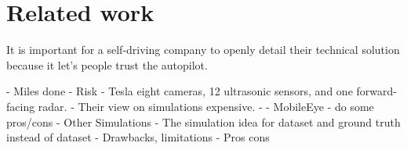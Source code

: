 \chapter{Related work}
\label{chap:relatedwork}


It is important for a self-driving company to openly detail their technical solution because it let's people trust the autopilot.

- Miles done
- Risk
- Tesla  eight cameras, 12 ultrasonic sensors, and one forward-facing radar.
  - Their view on simulations
expensive.
  - 
- MobileEye
  -  do some pros/cons
- Other Simulations
- The simulation idea for dataset and ground truth instead of dataset
  - Drawbacks, limitations
  - Pros cons